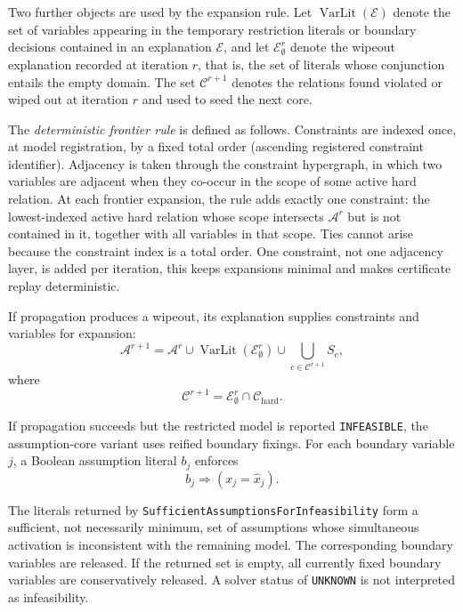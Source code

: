\documentclass[pdflatex,sn-mathphys-num,iicol,oneside]{sn-jnl}
\begin{document}
Two further objects are used by the expansion rule. Let
$\operatorname{VarLit}(\mathcal{E})$ denote the set of variables
appearing in the temporary restriction literals or boundary decisions
contained in an explanation $\mathcal{E}$, and let
$\mathcal{E}_{\emptyset}^{r}$ denote the wipeout explanation recorded
at iteration $r$, that is, the set of literals whose conjunction
entails the empty domain. The set $\mathcal{C}^{r+1}$ denotes the
relations found violated or wiped out at iteration $r$ and used to
seed the next core.

The \emph{deterministic frontier rule} is defined as follows.
Constraints are indexed once, at model registration, by a fixed total
order (ascending registered constraint identifier). Adjacency is
taken through the constraint hypergraph, in which two variables are
adjacent when they co-occur in the scope of some active hard
relation. At each frontier expansion, the rule adds exactly one
constraint: the lowest-indexed active hard relation whose scope
intersects $\mathcal{A}^{r}$ but is not contained in it, together
with all variables in that scope. Ties cannot arise because the
constraint index is a total order. One constraint, not one adjacency
layer, is added per iteration, this keeps expansions minimal and
makes certificate replay deterministic.

If propagation produces a wipeout, its explanation supplies
constraints and variables for expansion:
\begin{equation}
\mathcal{A}^{r+1}
=
\mathcal{A}^{r}
\cup
\operatorname{VarLit}
\left(
\mathcal{E}_{\emptyset}^{r}
\right)
\cup
\bigcup_{c\in\mathcal{C}^{r+1}}S_c,
\label{eq:variable-expansion}
\end{equation}
where
\begin{equation}
\mathcal{C}^{r+1}
=
\mathcal{E}_{\emptyset}^{r}
\cap
\mathcal{C}_{\mathrm{hard}}.
\end{equation}

If propagation succeeds but the restricted model is reported
\texttt{INFEASIBLE}, the assumption-core variant uses reified
boundary fixings. For each boundary variable $j$, a Boolean assumption
literal $b_j$ enforces
\begin{equation}
b_j
\Rightarrow
\left(
x_j=\widehat{x}_j
\right).
\end{equation}

The literals returned by
\texttt{SufficientAssumptionsForInfeasibility} form a sufficient, not
necessarily minimum, set of assumptions whose simultaneous activation
is inconsistent with the remaining model. The corresponding boundary
variables are released. If the returned set is empty, all currently
fixed boundary variables are conservatively released. A solver status
of \texttt{UNKNOWN} is not interpreted as infeasibility.
\end{document}
